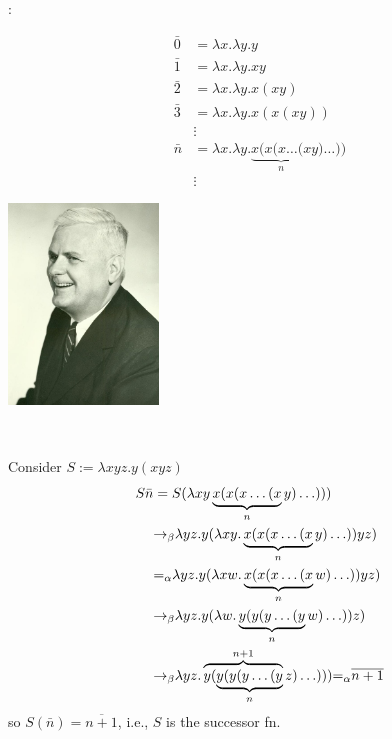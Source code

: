 \begin{frame}

:

\begin{align*}
\bar{0} &= \lambda x.\lambda y.y \\
\bar{1} &= \lambda x.\lambda y.xy \\
\bar{2} &= \lambda x.\lambda y.x(xy) \\
\bar{3} &= \lambda x.\lambda y.x(x(xy)) \\
        &\vdots \\
\bar{n} &= \lambda x.\lambda y.\underbrace{x(x(x\ldots(x}_{n}y)\ldots)) \\
        &\vdots
\end{align*}
\end{frame}

\begin{frame}
\begin{minipage}{5cm}
\includegraphics[width=4cm]{figures/AlonzoChurch.jpg}
\end{minipage}
\begin{minipage}{5cm}
 \\
\end{minipage}
\end{frame}

\begin{frame}
Consider $S:=\lambda xyz.y(xyz)$
\begin{align*}
S\bar{n} &= S(\lambda xy\underbrace{x(x(x\ldots(x}_{n}y)\ldots))) \\
&{\rightarrow_\beta} \lambda yz.y(\lambda xy.\underbrace{x(x(x\ldots(x}_{n}y)\ldots))yz) \\
&{=_\alpha} \lambda yz.y(\lambda xw.\underbrace{x(x(x\ldots(x}_{n}w)\ldots))yz) \\
&{\rightarrow_\beta} \lambda yz.y(\lambda w.\underbrace{y(y(y\ldots(y}_{n}w)\ldots))z) \\
&{\rightarrow_\beta} \lambda yz.\overbrace{y(\underbrace{y(y(y\ldots(y}_{n}}^{n+1}z)
\ldots))) {=_\alpha} \overline{n+1}
\end{align*}
so $S(\bar{n})=\overline{n+1}$, i.e., $S$ is the successor fn.
\end{frame}

